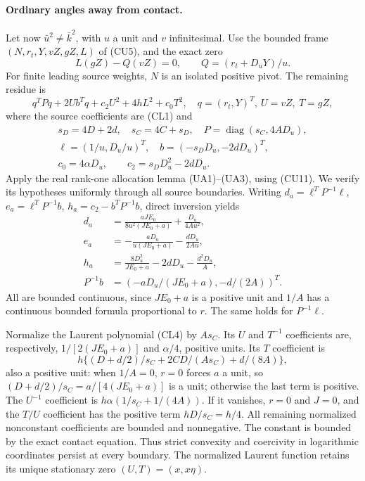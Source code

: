 \paragraph{Ordinary angles away from contact.}
Let now $\bar u^2\ne\bar k^2$, with $u$ a unit and $v$ infinitesimal.
Use the bounded frame $(N,r_t,Y,vZ,gZ,L)$ of (CU5), and the exact zero
\[
 L(gZ)-Q(vZ)=0,\qquad Q=(r_t+D_uY)/u.              \tag{CU11}
\]
For finite leading source weights, $N$ is an isolated positive pivot.
The remaining residue is
\[
 q^TPq+2Ub^Tq+c_2U^2+4hL^2+c_0T^2,
 \quad q=(r_t,Y)^T,\ U=vZ,\ T=gZ,
\]
where the source coefficients are (CL1) and
\[
\begin{gathered}
 s_D=4D+2d,\quad s_C=4C+s_D,\quad
 P=\operatorname{diag}(s_C,4AD_u),\\
 \ell=(1/u,D_u/u)^T,\quad b=(-s_DD_u,-2dD_u)^T,\\
 c_0=4\alpha D_u,\qquad c_2=s_DD_u^2-2dD_u.
\end{gathered}                                                     \tag{CU12}
\]
Apply the real rank-one allocation lemma (UA1)--(UA3), using (CU11).
We verify its hypotheses uniformly through all source boundaries.
Writing $d_a=\ell^TP^{-1}\ell$, $e_a=\ell^TP^{-1}b$,
$h_a=c_2-b^TP^{-1}b$, direct inversion yields
\[
\begin{aligned}
 d_a&=\frac{aJE_0}{8u^2(JE_0+a)}+\frac{D_u}{4Au^2},\\
 e_a&=-\frac{aD_u}{u(JE_0+a)}-\frac{dD_u}{2Au},\\
 h_a&=\frac{8D_u^2}{JE_0+a}-2dD_u-\frac{d^2D_u}{A},\\
 P^{-1}b&=(-aD_u/(JE_0+a),-d/(2A))^T.
\end{aligned}                                                     \tag{CU13}
\]
All are bounded continuous, since $JE_0+a$ is a positive unit and
$1/A$ has a continuous bounded formula proportional to $r$.
The same holds for $P^{-1}\ell$.

Normalize the Laurent polynomial (CL4) by $As_C$.
Its $U$ and $T^{-1}$ coefficients are, respectively,
$1/[2(JE_0+a)]$ and $\alpha/4$, positive units.
Its $T$ coefficient is
\[
 h\{(D+d/2)/s_C+2CD/(As_C)+d/(8A)\},
\]
also a positive unit: when $1/A=0$, $r=0$ forces $a$ a unit,
so $(D+d/2)/s_C=a/[4(JE_0+a)]$ is a unit; otherwise the last term
is positive. The $U^{-1}$ coefficient is
$h\alpha(1/s_C+1/(4A))$. If it vanishes, $r=0$ and $J=0$,
and the $T/U$ coefficient has the positive term $hD/s_C=h/4$.
All remaining normalized nonconstant coefficients are bounded and
nonnegative. The constant is bounded by the exact contact equation.
Thus strict convexity and coercivity in logarithmic coordinates
persist at every boundary. The normalized Laurent function retains
its unique stationary zero $(U,T)=(x,x\eta)$.

